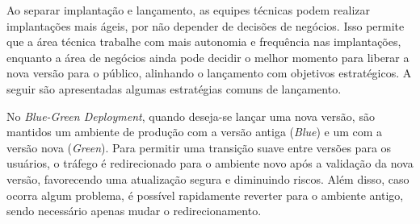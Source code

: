 Ao separar implantação e lançamento, as equipes técnicas podem realizar implantações mais ágeis, por não depender de decisões de negócios. Isso permite que a área técnica trabalhe com mais autonomia e frequência nas implantações, enquanto a área de negócios ainda pode decidir o melhor momento para liberar a nova versão para o público, alinhando o lançamento com objetivos estratégicos. A seguir são apresentadas algumas estratégias comuns de lançamento.






No \emph{Blue-Green Deployment}, quando deseja-se lançar uma nova versão, são mantidos um ambiente de produção com a versão antiga (\emph{Blue}) e um com a versão nova (\emph{Green}). Para permitir uma transição suave entre versões para os usuários, o tráfego é redirecionado para o ambiente novo após a validação da nova versão, favorecendo uma atualização segura e diminuindo riscos. Além disso, caso ocorra algum problema, é possível rapidamente reverter para o ambiente antigo, sendo necessário apenas mudar o redirecionamento.
\cite{martin-fowler-bluegreen}

